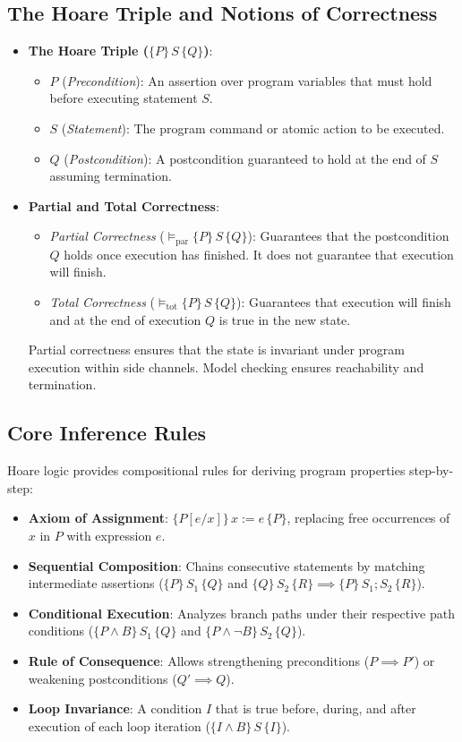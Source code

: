 \documentclass[a4paper,12pt]{report}
\begin{document}
\subsection{The Hoare Triple and Notions of Correctness}
\begin{itemize}[itemsep=0.25em, topsep=0.15em]
    \item \textbf{The Hoare Triple ($\{P\}\, S \,\{Q\}$)}:
    \begin{itemize}[itemsep=0.15em]
        \item $P$ (\emph{Precondition}): An assertion over program variables that must hold before executing statement $S$.
        \item $S$ (\emph{Statement}): The program command or atomic action to be executed.
        \item $Q$ (\emph{Postcondition}): A postcondition guaranteed to hold at the end of $S$ assuming termination.
    \end{itemize}
    \item \textbf{Partial and Total Correctness}:
    \begin{itemize}[itemsep=0.15em]
        \item \emph{Partial Correctness} ($\models_{\text{par}} \{P\}\, S \,\{Q\}$): Guarantees that the postcondition $Q$ holds once execution has finished. It does not guarantee that execution will finish.
        \item \emph{Total Correctness} ($\models_{\text{tot}} \{P\}\, S \,\{Q\}$): Guarantees that execution will finish and at the end of execution $Q$ is true in the new state.
    \end{itemize}
    Partial correctness ensures that the state is invariant under program execution within side channels. Model checking ensures reachability and termination.
\end{itemize}

\subsection{Core Inference Rules}
Hoare logic provides compositional rules for deriving program properties step-by-step:
\begin{itemize}[itemsep=0.25em, topsep=0.15em]
    \item \textbf{Axiom of Assignment}: $\{P[e/x]\}\, x := e \,\{P\}$, replacing free occurrences of $x$ in $P$ with expression $e$.
    \item \textbf{Sequential Composition}: Chains consecutive statements by matching intermediate assertions ($\{P\}\, S_1 \,\{Q\}$ and $\{Q\}\, S_2 \,\{R\} \implies \{P\}\, S_1; S_2 \,\{R\}$).
    \item \textbf{Conditional Execution}: Analyzes branch paths under their respective path conditions ($\{P \land B\}\, S_1 \,\{Q\}$ and $\{P \land \neg B\}\, S_2 \,\{Q\}$).
    \item \textbf{Rule of Consequence}: Allows strengthening preconditions ($P \implies P'$) or weakening postconditions ($Q' \implies Q$).
    \item \textbf{Loop Invariance}: A condition $I$ that is true before, during, and after execution of each loop iteration ($\{I \land B\}\, S \,\{I\}$).
\end{itemize}
\end{document}

